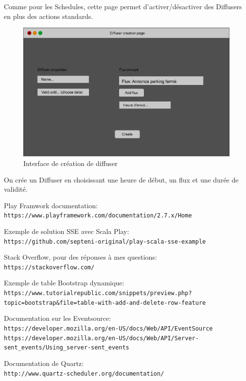 \documentclass[french]{article}
\begin{document}
\begin{appendices}
	Comme pour les Schedules, cette page permet d'activer/désactiver des Diffusers en plus des actions standards.
	
	\begin{figure}[h!]
		\centering
		\includegraphics[scale=0.3]{mockup/m_diffuser_creation}
		\caption{Interface de création de diffuser}
		\label{fig:diffuserCreation}
	\end{figure}
	
	On crée un Diffuser en choisissant une heure de début, un flux et une durée de validité.
 
\end{appendices}

\newpage
\begin{thebibliography}{9}
Play Framwork documentation:
\\\texttt{https://www.playframework.com/documentation/2.7.x/Home}
 
Exemple de solution SSE avec Scala Play:
\\\texttt{https://github.com/septeni-original/play-scala-sse-example}

Stack Overflow, pour des réponses à mes questions:
\\\texttt{https://stackoverflow.com/}

Exemple de table Bootstrap dynamique:
\\\texttt{https://www.tutorialrepublic.com/snippets/preview.php?topic=bootstrap\&file=table-with-add-and-delete-row-feature}

Documentation sur les Eventsource:
\\\texttt{https://developer.mozilla.org/en-US/docs/Web/API/EventSource}
\\\texttt{https://developer.mozilla.org/en-US/docs/Web/API/Server-sent\_events/Using\_server-sent\_events}

Documentation de Quartz: 
\\\texttt{http://www.quartz-scheduler.org/documentation/}


\end{thebibliography}
\end{document}
